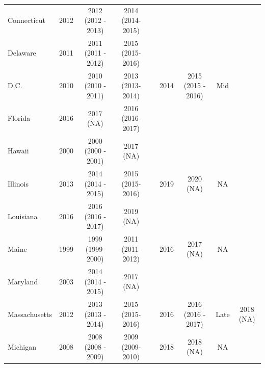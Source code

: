 \documentclass[12pt]{article}%
\begin{document}
\begin{appendices}
\begin{table}[htp!]
\begin{adjustbox}{width=\textwidth}
\begin{tabular}{@{}lccclcccc@{}}
Connecticut   & 2012       & 2012 (2012 - 2013)                         & 2014 (2014-2015)                          &  &            &                    &              &                             \\
Delaware      & 2011       & 2011 (2011 - 2012)                         & 2015 (2015-2016)                          &  &            &                    &              &                             \\
D.C.          & 2010       & 2010 (2010 - 2011)                         & 2013 (2013-2014)                          &  & 2014       & 2015 (2015 - 2016) & Mid          &                             \\
Florida       & 2016       & 2017 (NA)                                  & 2016 (2016-2017)\sym{**} &  &            &                    &              &                             \\
Hawaii        & 2000       & 2000 (2000 - 2001)                         & 2017 (NA)                                 &  &            &                    &              &                             \\
Illinois      & 2013       & 2014 (2014 - 2015)                         & 2015 (2015-2016)                          &  & 2019       & 2020 (NA)          & NA           &                             \\
Louisiana     & 2016       & 2016 (2016 - 2017)                         & 2019 (NA)                                 &  &            &                    &              &                             \\
Maine         & 1999       & 1999 (1999- 2000)                          & 2011 (2011-2012)                          &  & 2016       & 2017 (NA)          & NA           &                             \\
Maryland      & 2003       & 2014 (2014 - 2015)\sym{*} & 2017 (NA)                                 &  &            &                    &              &                             \\
Massachusetts & 2012       & 2013 (2013 - 2014)                         & 2015 (2015-2016)                          &  & 2016       & 2016 (2016 - 2017) & Late         & 2018 (NA)                   \\
Michigan      & 2008       & 2008 (2008 - 2009)                         & 2009 (2009-2010)                          &  & 2018       & 2018 (NA)          & NA           &                             \\

\end{tabular}
\end{adjustbox}
\end{table}
\end{appendices}
\end{document}
